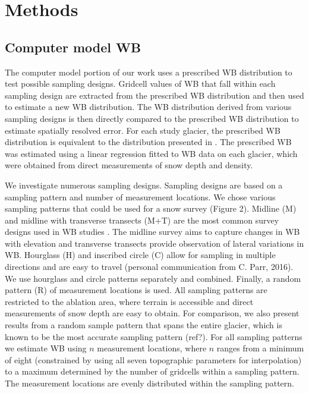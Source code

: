 \documentclass[twocolumn,letterpaper]{igs}
\begin{document}
\section{Methods}

\subsection{Computer model WB}

The computer model portion of our work uses a prescribed WB distribution to test possible sampling designs. Gridcell values of WB that fall within each sampling design are extracted from the prescribed WB distribution and then used to estimate a new WB distribution. The WB distribution derived from various sampling designs is then directly compared to the prescribed WB distribution to estimate spatially resolved error. For each study glacier, the prescribed WB distribution is equivalent to the distribution presented in \cite{Pulwicki2017}. The prescribed WB was estimated using a linear regression fitted to WB data on each glacier, which were obtained from direct measurements of snow depth and density. 

We investigate numerous sampling designs. Sampling designs are based on a sampling pattern and number of measurement locations. We chose various sampling patterns that could be used for a snow survey (Figure 2). Midline (M) and midline with transverse transects (M+T) are the most common survey designs used in WB studies \citep[e.g.][]{Kaser2002,Machguth2006}. The midline survey aims to capture changes in WB with elevation and transverse transects provide observation of lateral variations in WB. Hourglass (H) and inscribed circle (C) allow for sampling in multiple directions and are easy to travel (personal communication from C. Parr, 2016). We use hourglass and circle patterns separately and combined. Finally, a random pattern (R) of measurement locations is used. All sampling patterns are restricted to the ablation area, where terrain is accessible and direct measurements of snow depth are easy to obtain. For comparison, we also present results from a random sample pattern that spans the entire glacier, which is known to be the most accurate sampling pattern (ref?). For all sampling patterns we estimate WB using $n$ measurement locations, where $n$ ranges from a minimum of eight (constrained by using all seven topographic parameters for interpolation) to a maximum determined by the number of gridcells within a sampling pattern. The measurement locations are evenly distributed within the sampling pattern. 
\end{document}
